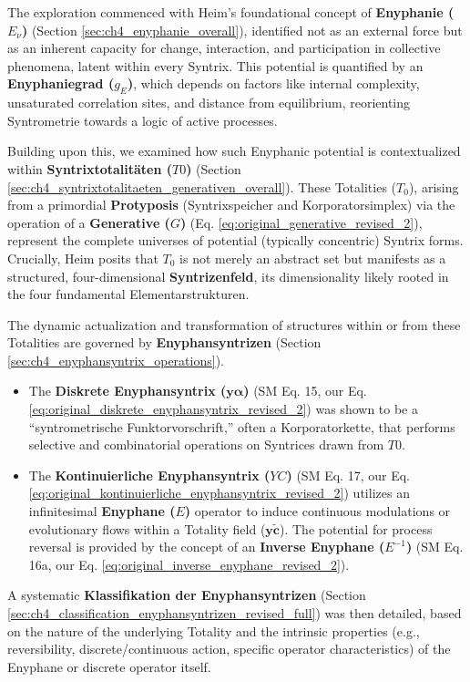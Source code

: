 \documentclass[
    12pt,              %
    a4paper,           %
    headings=normal,   %
    twoside=true,      %
    BCOR=8mm,          %
]{scrbook}
\newcommand{\q}[1]{\enquote{#1}}
\newcommand{\enyphaniegrad}{g_E}
\newcommand{\syntrixtotalitaet}{T0}
\newcommand{\generative}{G}
\newcommand{\diskreteEnyphansyntrix}{\bm{y\alpha}}
\newcommand{\kontinuierlicheEnyphansyntrix}{YC}
\newcommand{\enyphane}{E}
\begin{document}
The exploration commenced with Heim’s foundational concept of \textbf{Enyphanie (\(E_\nu\))} (Section \ref{sec:ch4_enyphanie_overall}), identified not as an external force but as an inherent capacity for change, interaction, and participation in collective phenomena, latent within every Syntrix. This potential is quantified by an \textbf{Enyphaniegrad (\(\enyphaniegrad\))}, which depends on factors like internal complexity, unsaturated correlation sites, and distance from equilibrium, reorienting Syntrometrie towards a logic of active processes.

Building upon this, we examined how such Enyphanic potential is contextualized within \textbf{Syntrixtotalitäten (\(\syntrixtotalitaet\))} (Section \ref{sec:ch4_syntrixtotalitaeten_generativen_overall}). These Totalities (\(T_0\)), arising from a primordial \textbf{Protyposis} (Syntrixspeicher and Korporatorsimplex) via the operation of a \textbf{Generative (\(\generative\))} (Eq. \eqref{eq:original_generative_revised_2}), represent the complete universes of potential (typically concentric) Syntrix forms. Crucially, Heim posits that \(T_0\) is not merely an abstract set but manifests as a structured, four-dimensional \textbf{Syntrizenfeld}, its dimensionality likely rooted in the four fundamental Elementarstrukturen.

The dynamic actualization and transformation of structures within or from these Totalities are governed by \textbf{Enyphansyntrizen} (Section \ref{sec:ch4_enyphansyntrix_operations}).
\begin{itemize}
    \item   The \textbf{Diskrete Enyphansyntrix (\(\diskreteEnyphansyntrix\))} (SM Eq. 15, our Eq. \eqref{eq:original_diskrete_enyphansyntrix_revised_2}) was shown to be a \q{syntrometrische Funktorvorschrift,} often a Korporatorkette, that performs selective and combinatorial operations on Syntrices drawn from \(\syntrixtotalitaet\).
    \item   The \textbf{Kontinuierliche Enyphansyntrix (\(\kontinuierlicheEnyphansyntrix\))} (SM Eq. 17, our Eq. \eqref{eq:original_kontinuierliche_enyphansyntrix_revised_2}) utilizes an infinitesimal \textbf{Enyphane (\(\enyphane\))} operator to induce continuous modulations or evolutionary flows within a Totality field (\(\bm{y\widetilde{c}}\)). The potential for process reversal is provided by the concept of an \textbf{Inverse Enyphane (\(\enyphane^{-1}\))} (SM Eq. 16a, our Eq. \eqref{eq:original_inverse_enyphane_revised_2}).
\end{itemize}
A systematic \textbf{Klassifikation der Enyphansyntrizen} (Section \ref{sec:ch4_classification_enyphansyntrizen_revised_full}) was then detailed, based on the nature of the underlying Totality and the intrinsic properties (e.g., reversibility, discrete/continuous action, specific operator characteristics) of the Enyphane or discrete operator itself.
\end{document}
